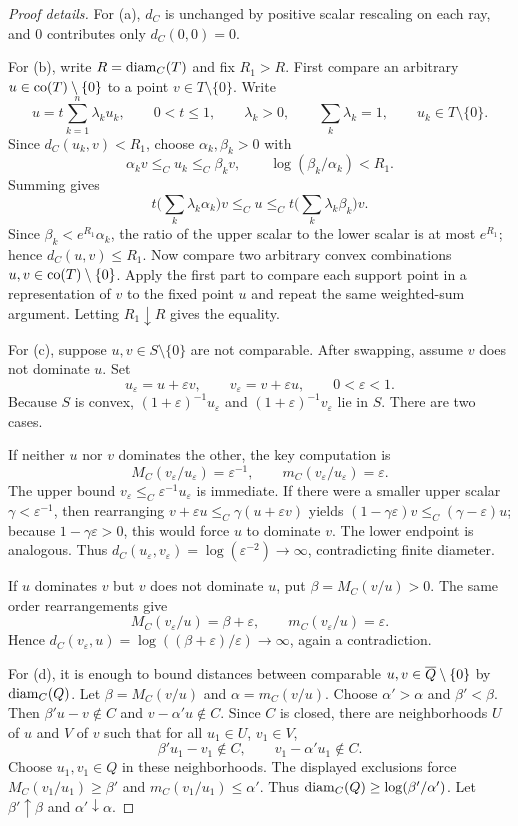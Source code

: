 \begin{proof}[Proof details]
For (a), $d_C$ is unchanged by positive scalar rescaling on each ray, and $0$ contributes only $d_C(0,0)=0$.

For (b), write $R=\operatorname{diam}_C(T)$ and fix $R_1>R$.
First compare an arbitrary $u\in\operatorname{co}(T)\setminus\{0\}$ to a point $v\in T\setminus\{0\}$.
Write
\[
  u=t\sum_{k=1}^n \lambda_k u_k,
  \qquad 0<t\le1,
  \qquad \lambda_k>0,
  \qquad \sum_k\lambda_k=1,
  \qquad u_k\in T\setminus\{0\}.
\]
Since $d_C(u_k,v)<R_1$, choose $\alpha_k,\beta_k>0$ with
\[
  \alpha_k v\le_C u_k\le_C \beta_k v,
  \qquad \log(\beta_k/\alpha_k)<R_1.
\]
Summing gives
\[
  t\Big(\sum_k\lambda_k\alpha_k\Big)v\le_C u\le_C
  t\Big(\sum_k\lambda_k\beta_k\Big)v.
\]
Since $\beta_k<e^{R_1}\alpha_k$, the ratio of the upper scalar to the lower scalar is at most $e^{R_1}$; hence $d_C(u,v)\le R_1$.
Now compare two arbitrary convex combinations $u,v\in\operatorname{co}(T)\setminus\{0\}$.
Apply the first part to compare each support point in a representation of $v$ to the fixed point $u$ and repeat the same weighted-sum argument.
Letting $R_1\downarrow R$ gives the equality.

For (c), suppose $u,v\in S\setminus\{0\}$ are not comparable.
After swapping, assume $v$ does not dominate $u$.
Set
\[
  u_\varepsilon=u+\varepsilon v,
  \qquad
  v_\varepsilon=v+\varepsilon u,
  \qquad 0<\varepsilon<1.
\]
Because $S$ is convex, $(1+\varepsilon)^{-1}u_\varepsilon$ and $(1+\varepsilon)^{-1}v_\varepsilon$ lie in $S$.
There are two cases.

If neither $u$ nor $v$ dominates the other, the key computation is
\[
  M_C(v_\varepsilon/u_\varepsilon)=\varepsilon^{-1},
  \qquad
  m_C(v_\varepsilon/u_\varepsilon)=\varepsilon.
\]
The upper bound $v_\varepsilon\le_C\varepsilon^{-1}u_\varepsilon$ is immediate.
If there were a smaller upper scalar $\gamma<\varepsilon^{-1}$, then rearranging
$v+\varepsilon u\le_C\gamma(u+\varepsilon v)$ yields
$(1-\gamma\varepsilon)v\le_C(\gamma-\varepsilon)u$;
because $1-\gamma\varepsilon>0$, this would force $u$ to dominate $v$.
The lower endpoint is analogous.
Thus $d_C(u_\varepsilon,v_\varepsilon)=\log(\varepsilon^{-2})\to\infty$, contradicting finite diameter.

If $u$ dominates $v$ but $v$ does not dominate $u$, put $\beta=M_C(v/u)>0$.
The same order rearrangements give
\[
  M_C(v_\varepsilon/u)=\beta+\varepsilon,
  \qquad
  m_C(v_\varepsilon/u)=\varepsilon.
\]
Hence $d_C(v_\varepsilon,u)=\log((\beta+\varepsilon)/\varepsilon)\to\infty$, again a contradiction.

For (d), it is enough to bound distances between comparable $u,v\in\overline{Q}\setminus\{0\}$ by $\operatorname{diam}_C(Q)$.
Let $\beta=M_C(v/u)$ and $\alpha=m_C(v/u)$.
Choose $\alpha'>\alpha$ and $\beta'<\beta$.
Then $\beta'u-v\notin C$ and $v-\alpha'u\notin C$.
Since $C$ is closed, there are neighborhoods $U$ of $u$ and $V$ of $v$ such that for all $u_1\in U$, $v_1\in V$,
\[
  \beta'u_1-v_1\notin C,
  \qquad
  v_1-\alpha'u_1\notin C.
\]
Choose $u_1,v_1\in Q$ in these neighborhoods.
The displayed exclusions force $M_C(v_1/u_1)\ge\beta'$ and $m_C(v_1/u_1)\le\alpha'$.
Thus $\operatorname{diam}_C(Q)\ge \log(\beta'/\alpha')$.
Let $\beta'\uparrow\beta$ and $\alpha'\downarrow\alpha$.
\end{proof}


